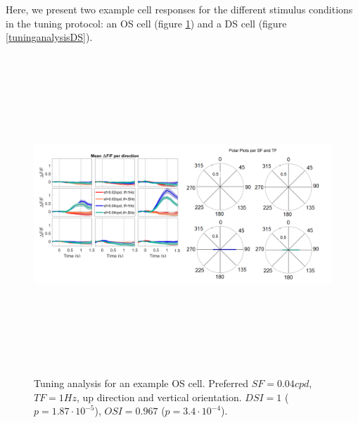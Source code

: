 Here, we present two example cell responses for the different stimulus conditions in the tuning protocol: an OS cell (figure \ref{tuninganalysisOS}) and a DS cell (figure \ref{tuninganalysisDS}).

\begin{figure}[H] \centering \includegraphics[width=12cm,height=12cm,keepaspectratio]{Figures/7.Results/tuning/MF379_pos2_p3_ROI0051.png} 
\caption{Tuning analysis for an example OS cell. Preferred $SF=0.04 cpd$, $TF=1 Hz$, up direction and vertical orientation. $DSI=1$ ($p=1.87 \cdot 10^{-5}$), $OSI=0.967$ ($p=3.4 \cdot 10^{-4}$).}
\label{tuninganalysisOS}
\end{figure}

